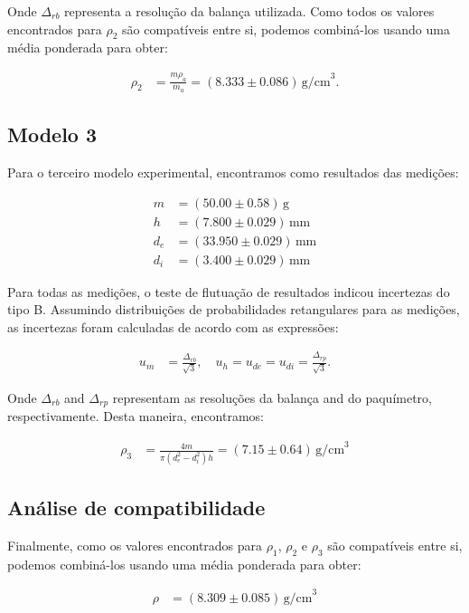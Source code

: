 \documentclass{article}
\begin{document}
\begin{multicols}{2}
Onde $\Delta_{rb}$ representa a resolução da balança utilizada. Como todos os valores encontrados para $\rho_2$ são compatíveis entre si, podemos combiná-los usando uma média ponderada para obter:

\begin{align}
\rho_2 &= \frac{m\rho_a}{m_a} = (8.333 \pm 0.086) \, \text{g/cm}^3.
\end{align}

\subsection{Modelo 3}

Para o terceiro modelo experimental, encontramos como resultados das medições:

\begin{align*}
m &= (50.00 \pm 0.58) \, \text{g} \\
h &= (7.800 \pm 0.029) \, \text{mm} \\
d_e &= (33.950 \pm 0.029) \, \text{mm} \\
d_i &= (3.400 \pm 0.029) \, \text{mm}
\end{align*}

Para todas as medições, o teste de flutuação de resultados indicou incertezas do tipo B. Assumindo distribuições de probabilidades retangulares para as medições, as incertezas foram calculadas de acordo com as expressões:

\begin{align}
u_m &= \frac{\Delta_{rb}}{\sqrt{3}}, \quad u_h = u_{de} = u_{di} = \frac{\Delta_{rp}}{\sqrt{3}}.
\end{align}

Onde $\Delta_{rb}$ and $\Delta_{rp}$ representam as resoluções da balança and do paquímetro, respectivamente. Desta maneira, encontramos:

\begin{align}
\rho_3 &= \frac{4m}{\pi (d^2_e - d^2_i)h} = (7.15 \pm 0.64) \, \text{g/cm}^3
\end{align}

\subsection{Análise de compatibilidade}

Finalmente, como os valores encontrados para $\rho_1$, $\rho_2$ e $\rho_3$ são compatíveis entre si, podemos combiná-los usando uma média ponderada para obter:

\begin{align}
\rho &= (8.309 \pm 0.085) \, \text{g/cm}^3
\end{align}


\end{multicols}
\end{document}
